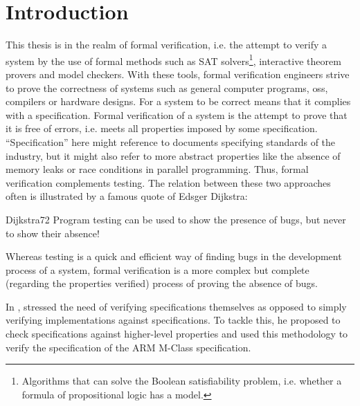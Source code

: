 
\chapter{Introduction}
\label{chp:introduction}

This thesis is in the realm of formal verification, i.e. the attempt to verify a system by the use of formal methods such as SAT solvers\footnote{%
    Algorithms that can solve the Boolean satisfiability problem, i.e. whether a formula of propositional logic has a model.
}, interactive theorem provers and model checkers.
With these tools, formal verification engineers strive to prove the correctness of systems such as general computer programs, \glspl{os}, compilers or hardware designs.
For a system to be correct means that it complies with a specification.
Formal verification of a system is the attempt to prove that it is free of errors, i.e. meets all properties imposed by some specification.
\enquote{Specification} here might reference to documents specifying standards of the industry, but it might also refer to more abstract properties like the absence of memory leaks or race conditions in parallel programming.
Thus, formal verification complements testing.
The relation between these two approaches often is illustrated by a famous quote of Edsger Dijkstra:

\begin{displaycquote}[p.6]{Dijkstra72}
    Program testing can be used to show the presence of bugs, but never to show their absence!
\end{displaycquote}

Whereas testing is a quick and efficient way of finding bugs in the development process of a system, formal verification is a more complex but complete (regarding the properties verified) process of proving the absence of bugs.

In  \cite{Reid17}, \citeauthor{Reid17} stressed the need of verifying specifications themselves as opposed to simply verifying implementations against specifications.
To tackle this, he proposed to check specifications against higher-level properties and used this methodology to verify the specification of the ARM M-Class specification.

